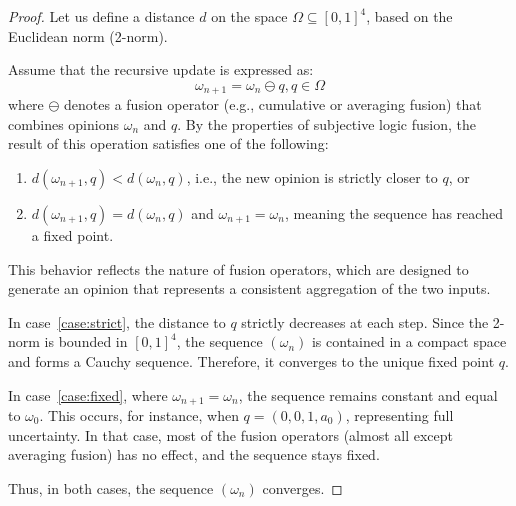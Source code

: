 \begin{proof}
Let us define a distance \( d \) on the space \( \Omega \subseteq [0,1]^4 \), based on the Euclidean norm (2-norm). 

Assume that the recursive update is expressed as:
\[
\omega_{n+1} = \omega_n \ominus q, q \in \Omega
\]
where \(\ominus\) denotes a fusion operator (e.g., cumulative or averaging fusion) that combines opinions \(\omega_n\) and \(q\). By the properties of subjective logic fusion, the result of this operation satisfies one of the following:

\begin{enumerate}
    \item \(d(\omega_{n+1}, q) < d(\omega_n, q)\), i.e., the new opinion is strictly closer to \(q\), or \label{case:strict}
    \item \(d(\omega_{n+1}, q) = d(\omega_n, q)\) and \(\omega_{n+1} = \omega_n\), meaning the sequence has reached a fixed point. \label{case:fixed}
\end{enumerate}

This behavior reflects the nature of fusion operators, which are designed to generate an opinion that represents a consistent aggregation of the two inputs.

In case~\ref{case:strict}, the distance to \(q\) strictly decreases at each step. Since the 2-norm is bounded in \([0,1]^4\), the sequence \((\omega_n)\) is contained in a compact space and forms a Cauchy sequence. Therefore, it converges to the unique fixed point \(q\).

In case~\ref{case:fixed}, where \(\omega_{n+1} = \omega_n\), the sequence remains constant and equal to \(\omega_0\). This occurs, for instance, when \(q= (0, 0, 1, a_0)\), representing full uncertainty. In that case, most of the fusion operators (almost all except averaging fusion) has no effect, and the sequence stays fixed.

Thus, in both cases, the sequence \((\omega_n)\) converges.
\end{proof}


